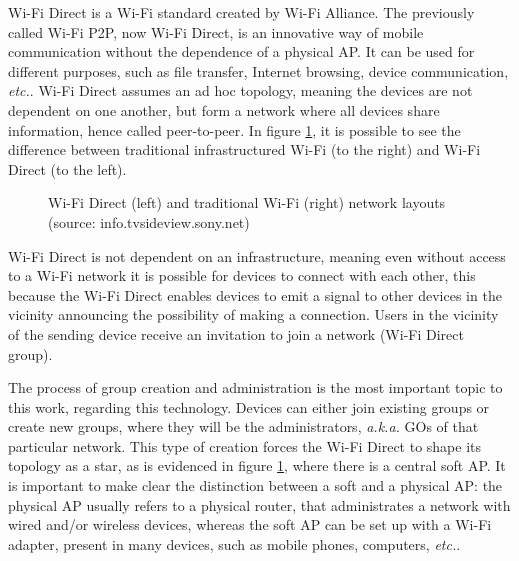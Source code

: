 Wi-Fi Direct is a Wi-Fi standard created by Wi-Fi Alliance. The previously called Wi-Fi P2P, now Wi-Fi Direct, is an innovative way of mobile communication without the dependence of a physical AP. It can be used for different purposes, such as file transfer, Internet browsing, device communication, \textit{etc.}. Wi-Fi Direct assumes an ad hoc topology, meaning the devices are not dependent on one another, but form a network where all devices share information, hence called peer-to-peer. In figure \ref{fig:wifidirnet}, it is possible to see the difference between traditional infrastructured Wi-Fi (to the right) and Wi-Fi Direct (to the left).

\begin{figure}[ht]
	\noindent{}
	\caption{\label{fig:wifidirnet} Wi-Fi Direct (left) and traditional Wi-Fi (right) network layouts (source: info.tvsideview.sony.net)}
\end{figure}

Wi-Fi Direct is not dependent on an infrastructure, meaning even without access to a Wi-Fi network it is possible for devices to connect with each other, this because the Wi-Fi Direct enables devices to emit a signal to other devices in the vicinity announcing the possibility of making a connection. Users in the vicinity of the sending device receive an invitation to join a network (Wi-Fi Direct group).

The process of group creation and administration is the most important topic to this work, regarding this technology. Devices can either join existing groups or create new groups, where they will be the administrators, \textit{a.k.a.} \glspl{GO} of that particular network. This type of creation forces the Wi-Fi Direct to shape its topology as a star, as is evidenced in figure \ref{fig:wifidirnet}, where there is a central soft \gls{AP}. It is important to make clear the distinction between a soft and a physical \gls{AP}: the physical \gls{AP} usually refers to a physical router, that administrates a network with wired and/or wireless devices, whereas the soft \gls{AP} can be set up with a Wi-Fi adapter, present in many devices, such as mobile phones, computers, \textit{etc.}.

